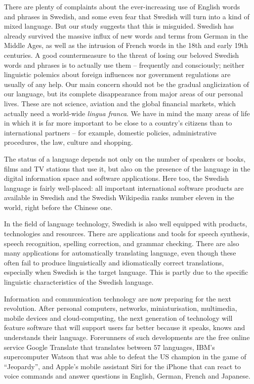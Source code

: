\begin{multicols}{2}
There are plenty of complaints about the ever-increasing use of
English words and phrases in Swedish, and some even fear that Swedish
will turn into a kind of mixed language. But our study \mbox{suggests} that
this is misguided. Swedish has already survived the massive influx of
new words and terms from German in the Middle Ages, as well as the
intrusion of French words in the 18th and early 19th centuries. A good
countermeasure to the threat of losing our beloved Swedish words and
phrases is to actually use them -- frequently and consciously; \mbox{neither}
linguistic polemics about foreign influences nor government
regulations are usually of any help. Our main concern should not be
the gradual angli\-cization of our language, but its complete
disappearance from major areas of our personal lives. These are not
science, aviation and the global financial markets, which actually
need a world-wide \emph{lingua franca}. We have in mind the many areas of
life in which it is far more important to be close to a country’s
citizens than to international partners -- for example, domestic
policies, administrative procedures, the law, culture and shopping.

The status of a language depends not only on the number of speakers or
books, films and TV \mbox{stations} that use it, but also on the presence of
the lang\-uage in the digital information space and software
applications. Here too, the Swedish language is fairly well-placed:
all important international software products are available in Swedish
and the Swedish Wikipedia ranks number eleven in the world,
right before the Chinese one.
 
In the field of language technology, Swedish is also well equipped
with products, technologies and \mbox{resources}. There are applications and
tools for speech synthesis, speech recognition, spelling \mbox{correction},
and grammar checking. There are also many applications for
automatically translating lang\-uage, even though these often fail to
produce linguistically and idiomatically correct translations,
especially when Swedish is the target lang\-uage. This is partly due to
the specific linguistic characteristics of the Swedish language.

Information and communication technology are now preparing for the
next revolution. \mbox{After} \mbox{personal} computers, net\-works, miniatur\-isation,
multi\-media, mobile devices and cloud-computing, the next generation of
technology will feature software that will support users far better
because it speaks, knows and understands their language. Forerunners
of such developments are the free online service Google Translate that
translates between 57 languages, IBM’s supercomputer Watson that was
able to defeat the US champion in the game of “Jeopardy”, and Apple’s
mobile assistant Siri for the iPhone that can react to voice commands
and answer questions in English, German, French and Japanese.


\end{multicols}
